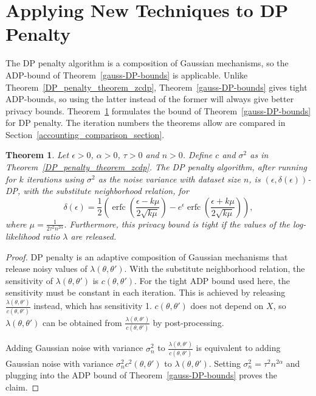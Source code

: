 \documentclass[english,twoside,openright]{HYgraduMLDS}
\newtheorem{theorem}[lemma]{Theorem}
\DeclareMathOperator{\erfc}{erfc}
\begin{document}
\section{Applying New Techniques to DP Penalty}\label{dp_penalty_adp_section}

The DP penalty algorithm is a composition of Gaussian mechanisms, so
the ADP-bound of Theorem~\ref{gauss-DP-bounds} is applicable. Unlike
Theorem~\ref{DP_penalty_theorem_zcdp}, Theorem~\ref{gauss-DP-bounds}
gives tight ADP-bounds, so using the latter instead of the former will
always give better privacy bounds. Theorem~\ref{DP_penalty_theorem_adp}
formulates the bound of Theorem~\ref{gauss-DP-bounds} for DP penalty.
The iteration numbers the theorems allow are compared in
Section~\ref{accounting_comparison_section}.

\begin{theorem}\label{DP_penalty_theorem_adp}
    Let \(\epsilon > 0\), \(\alpha > 0\), \(\tau > 0\) and \(n > 0\).
    Define \(c\) and \(\sigma^{2}\) as in Theorem~\ref{DP_penalty_theorem_zcdp}.
    The DP penalty algorithm, after running for \(k\) iterations using \(\sigma^{2}\)
    as the noise variance with dataset size \(n\),
    is \((\epsilon, \delta(\epsilon))\)-DP, with the substitute neighborhood
    relation, for
    \[
        \delta(\epsilon) 
        = \frac{1}{2}\left(
            \erfc\left(\frac{\epsilon - k\mu}{2\sqrt{k\mu}}\right)
            - e^\epsilon \erfc\left(\frac{\epsilon + k\mu}{2\sqrt{k\mu}}\right)
        \right),
    \]
    where \(\mu = \frac{1}{2\tau^2 n^{2\alpha}}\). Furthermore, this privacy
    bound is tight if the values of the log-likelihood ratio \(\lambda\) are
    released.
\end{theorem}
\begin{proof}
    DP penalty is an adaptive composition of Gaussian mechanisms that release 
    noisy values of \(\lambda(\theta, \theta')\). With the substitute neighborhood
    relation, the sensitivity of \(\lambda(\theta, \theta')\) is
    \(c(\theta, \theta')\). For the tight ADP bound used here, the sensitivity must be 
    constant in each iteration. This is achieved by releasing 
    \(\frac{\lambda(\theta, \theta')}{c(\theta, \theta')}\) instead, which 
    has sensitivity 1. \(c(\theta, \theta')\) does not depend on \(X\), 
    so \(\lambda(\theta, \theta')\) can be obtained from 
    \(\frac{\lambda(\theta, \theta')}{c(\theta, \theta')}\) by post-processing.

    Adding Gaussian noise with variance \(\sigma_n^2\) to 
    \(\frac{\lambda(\theta, \theta')}{c(\theta, \theta')}\)
    is equivalent to adding Gaussian noise with variance 
    \(\sigma_n^2 c^2(\theta, \theta')\) to \(\lambda(\theta, \theta')\).
    Setting \(\sigma_n^2 = \tau^2n^{2\alpha}\) and plugging into 
    the ADP bound of Theorem~\ref{gauss-DP-bounds} proves the 
    claim.
\end{proof}
\end{document}
